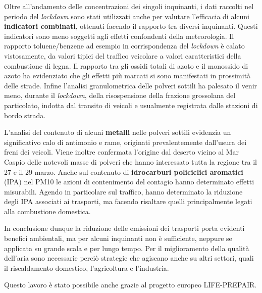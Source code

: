 Oltre all’andamento delle concentrazioni dei singoli inquinanti, i dati raccolti nel periodo del \textit{lockdown} sono stati utilizzati anche per valutare l’efficacia di alcuni \textbf{indicatori combinati}, ottenuti facendo il rapporto tra diversi inquinanti. Questi indicatori sono meno soggetti agli effetti confondenti della meteorologia.
Il rapporto toluene/benzene ad esempio in corrispondenza del \textit{lockdown} è calato vistosamente, da valori tipici del traffico veicolare a valori caratteristici della combustione di legna. Il rapporto tra gli ossidi totali di azoto e il monossido di azoto ha evidenziato che gli effetti più marcati si sono manifestati in prossimità delle strade. Infine l'analisi granulometrica delle polveri sottili ha palesato il venir meno, durante il \textit{lockdown}, della risospensione della frazione grossolana del particolato, indotta dal transito di veicoli e usualmente registrata dalle stazioni di bordo strada.

L'analisi del contenuto di alcuni \textbf{metalli} nelle polveri sottili evidenzia un significativo calo di antimonio e rame, originati prevalentemente dall'usura dei freni dei veicoli. Viene inoltre confermata l'origine dal deserto vicino al Mar Caspio delle notevoli masse di polveri che hanno interessato tutta la regione tra il 27 e il 29 marzo.
Anche sul contenuto di \textbf{idrocarburi policiclici aromatici} (IPA) nel PM10 le azioni di contenimento del contagio hanno determinato effetti misurabili. Agendo in particolare sul traffico, hanno determinato la riduzione degli IPA associati ai trasporti, ma facendo risaltare quelli principalmente legati alla combustione domestica.

In conclusione dunque la riduzione delle emissioni dei trasporti porta evidenti benefici ambientali, ma per alcuni inquinanti non è sufficiente, neppure se applicata su grande scala e per lungo tempo. Per il miglioramento della qualità dell'aria sono necessarie perciò strategie che agiscano anche su altri settori, quali il riscaldamento domestico, l'agricoltura e l'industria.

\vfill
Questo lavoro è stato possibile anche grazie al progetto europeo LIFE-PREPAIR.